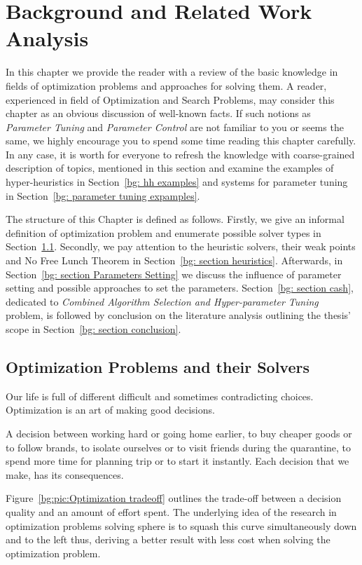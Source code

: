 \chapter{Background and Related Work Analysis}\label{bg}
In this chapter we provide the reader with a review of the basic knowledge in fields of optimization problems and approaches for solving them.
A reader, experienced in field of Optimization and Search Problems, may consider this chapter as an obvious discussion of well-known facts. 
If such notions as \textit{Parameter Tuning} and \textit{Parameter Control} are not familiar to you or seems the same, we highly encourage you to spend some time reading this chapter carefully.
In any case, it is worth for everyone to refresh the knowledge with coarse-grained description of topics, mentioned in this section and examine the examples of hyper-heuristics in Section~\ref{bg: hh examples} and systems for parameter tuning in Section~\ref{bg: parameter tuning expamples}.

The structure of this Chapter is defined as follows. Firstly, we give an informal definition of optimization problem and enumerate possible solver types in Section~\ref{bg:section problems and solvers}. Secondly, we pay attention to the heuristic solvers, their weak points and No Free Lunch Theorem in Section~\ref{bg: section heuristics}. Afterwards, in Section~\ref{bg: section Parameters Setting} we discuss the influence of parameter setting and possible approaches to set the parameters. Section~\ref{bg: section cash}, dedicated to \emph{Combined Algorithm Selection and Hyper-parameter Tuning} problem, is followed by conclusion on the literature analysis outlining the thesis' scope in Section~\ref{bg: section conclusion}.

\section{Optimization Problems and their Solvers}\label{bg:section problems and solvers}
Our life is full of different difficult and sometimes contradicting choices. Optimization is an art of making good decisions.

A decision between working hard or going home earlier, to buy cheaper goods or to follow brands, to isolate ourselves or to visit friends during the quarantine, to spend more time for planning trip or to start it instantly. Each decision that we make, has its consequences.

Figure~\ref{bg:pic:Optimization tradeoff} outlines the trade-off between a decision quality and an amount of effort spent. The underlying idea of the research in optimization problems solving sphere is to squash this curve simultaneously down and to the left thus, deriving a better result with less cost when solving the optimization problem.

